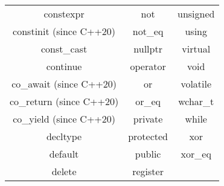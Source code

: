 \documentclass[../../LearnCpp.tex]{subfiles}
\begin{document}
\begin{center}
\begin{tabular}{ |c|c|c| }
    constexpr                & not           & unsigned               \\
    constinit (since C++20)  & not\_eq       & using                  \\
    const\_cast              & nullptr       & virtual                \\
    continue                 & operator      & void                   \\
    co\_await (since C++20)  & or            & volatile               \\
    co\_return (since C++20) & or\_eq        & wchar\_t               \\
    co\_yield (since C++20)  & private       & while                  \\
    decltype                 & protected     & xor                    \\
    default                  & public        & xor\_eq                \\
    delete                   & register      &                        \\

    \hline
  \end{tabular}
\end{center}
\end{document}
